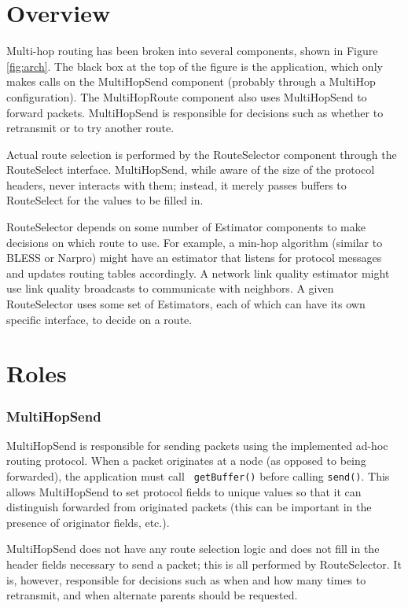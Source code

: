 \documentclass[10pt]{article}
\begin{document}
\section*{Overview}


Multi-hop routing has been broken into several components, shown in
Figure \ref{fig:arch}. The black box at the top of the figure is the
application, which only makes calls on the MultiHopSend component
(probably through a MultiHop configuration). The MultiHopRoute
component also uses MultiHopSend to forward packets. MultiHopSend is
responsible for decisions such as whether to retransmit or to try
another route.

Actual route selection is performed by the RouteSelector component
through the RouteSelect interface. MultiHopSend, while aware of the
size of the protocol headers, never interacts with them; instead, it
merely passes buffers to RouteSelect for the values to be filled in.

RouteSelector depends on some number of Estimator components to make
decisions on which route to use. For example, a min-hop algorithm
(similar to BLESS or Narpro) might have an estimator that listens for
protocol messages and updates routing tables accordingly. A network
link quality estimator might use link quality broadcasts to
communicate with neighbors. A given RouteSelector uses some set of
Estimators, each of which can have its own specific interface, to
decide on a route.

\section*{Roles}

\subsubsection*{MultiHopSend}

MultiHopSend is responsible for sending packets using the implemented
ad-hoc routing protocol. When a packet originates at a node (as
opposed to being forwarded), the application must call {\tt
getBuffer()} before calling {\tt send()}. This allows MultiHopSend to
set protocol fields to unique values so that it can distinguish
forwarded from originated packets (this can be important in the
presence of originator fields, etc.).

MultiHopSend does not have any route selection logic and does not fill
in the header fields necessary to send a packet; this is all performed
by RouteSelector. It is, however, responsible for decisions such as
when and how many times to retransmit, and when alternate parents
should be requested.
\end{document}

